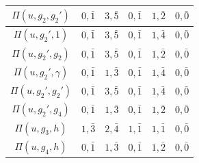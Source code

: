 \begin{landscape}
\begin{table}[h]
\begin{minipage}{0.40\textwidth}
\begin{tabular}{|c|ccccc|}
                $\Pi(u,g_2,g_2')$ & $0,\bar1$ & $3,\bar{5}$ & $0,\bar1$ & $1,\bar2$ & $0,\bar0$ \\\hline
                $\Pi(u,g_2',1)$ & $0,\bar1$ & $3,\bar{5}$ & $0,\bar1$ & $1,\bar{4}$ & $0,\bar0$ \\
                $\Pi(u,g_2',g_2)$ & $0,\bar1$ & $3,\bar{5}$ & $0,\bar1$ & $1,\bar2$ & $0,\bar0$ \\
                $\Pi(u,g_2',\gamma)$ & $0,\bar1$ & $1,\bar{3}$ & $0,\bar1$ & $1,\bar4$ & $0,\bar0$ \\
                $\Pi(u,g_2',g_2')$ & $0,\bar1$ & $3,\bar{5}$ & $0,\bar1$ & $1,\bar4$ & $0,\bar0$ \\
                $\Pi(u,g_2',g_4)$ & $0,\bar1$ & $1,\bar{3}$ & $0,\bar1$ & $1,\bar2$ & $0,\bar0$ \\\hline
                $\Pi(u,g_3,h)$ & $1,\bar{3}$ & $2,\bar{4}$ & $1,\bar1$ & $1,\bar1$ & $0,\bar0$ \\\hline
                $\Pi(u,g_4,h)$ & $0,\bar1$ & $1,\bar{3}$ & $0,\bar1$ & $1,\bar2$ & $0,\bar0$ \\\hline
            \end{tabular}
            \caption{}
        \end{minipage}
    \end{table}
    \newpage
    \fi
    \begin{table}[h]
        \centering %
        

\end{table}
\end{landscape}
